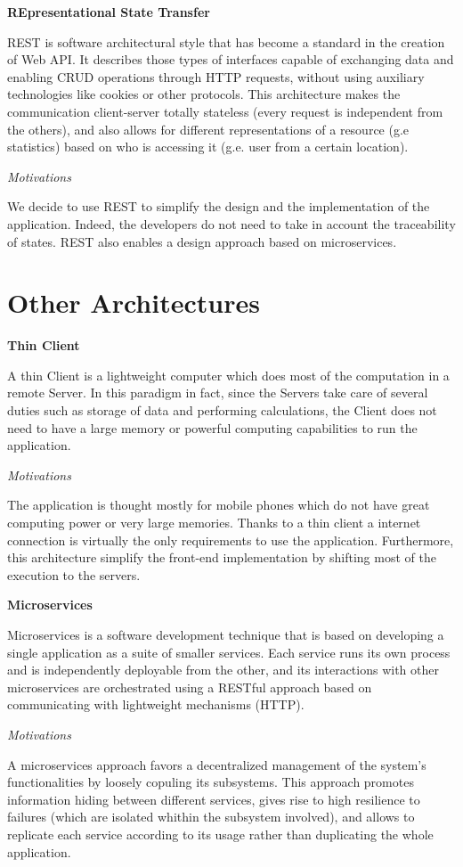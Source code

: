 \documentclass{report}
\begin{document}
\begin{center}\large{\textbf{REpresentational State Transfer}}\end{center}
REST is software architectural style that has become a standard in the creation of Web API. It describes those types of interfaces capable of exchanging data and enabling CRUD operations through HTTP requests, without using auxiliary technologies like cookies or other protocols. This architecture makes the communication client-server totally stateless (every request is independent from the others), and also allows for different representations of a resource (g.e statistics) based on who is accessing it (g.e. user from a certain location).
\begin{center}\large{\textit{Motivations}}\end{center}
We decide to use REST to simplify the design and the implementation of the application. Indeed, the developers do not need to take in account the traceability of states. REST also enables a design approach based on microservices.

\section{Other Architectures}
\begin{center}\large{\textbf{Thin Client}}\end{center}
A thin Client is a lightweight computer which does most of the computation in a remote Server. In this paradigm in fact, since the Servers take care of several duties such as storage 
of data and performing calculations, the Client does not need to have a large memory or powerful computing capabilities to run the application.
\begin{center}\large{\textit{Motivations}}\end{center} 
The application is thought mostly for mobile phones which do not have great computing power or very large memories. Thanks to a thin client a internet connection is virtually the only requirements to use the application. Furthermore, this architecture simplify the front-end implementation by shifting most of the execution to the servers.

\begin{center}\large{\textbf{Microservices}}\end{center}
Microservices is a software development technique that is based on developing a single application as a suite of smaller services. Each service runs its own process and is independently deployable from the other, and its interactions with other microservices are orchestrated using a RESTful approach based on communicating with lightweight mechanisms (HTTP).
\begin{center}\large{\textit{Motivations}}\end{center}
A microservices approach favors a decentralized management of the system's functionalities by loosely copuling its subsystems. This approach promotes information hiding between different services, gives rise to high resilience to failures (which are isolated whithin the subsystem involved), and allows to replicate each service according to its usage rather than duplicating the whole application. 
\end{document}
